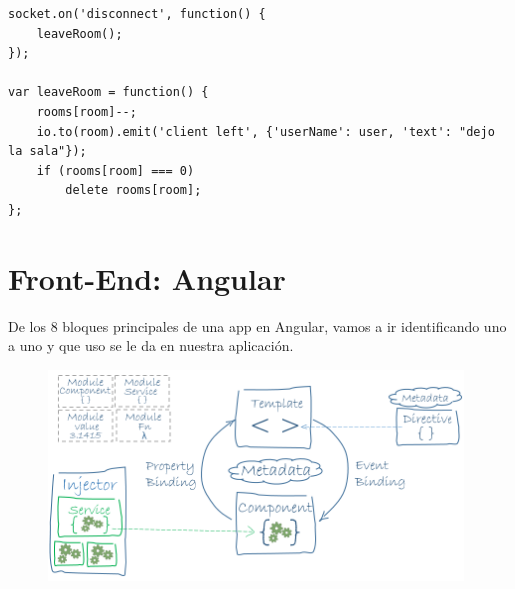 \begin{itemize}
\begin{enumerate}
\end{enumerate}

\begin{lstlisting}
socket.on('disconnect', function() {
    leaveRoom();
});

var leaveRoom = function() {
    rooms[room]--;
    io.to(room).emit('client left', {'userName': user, 'text': "dejo la sala"});
    if (rooms[room] === 0)
        delete rooms[room];
};
\end{lstlisting}


\end{itemize}

\section{Front-End: Angular}

De los 8 bloques principales de una app en Angular, vamos a ir identificando uno a uno y que uso se le da en nuestra aplicación.

\begin{figure}[H]
    \centering
    \includegraphics[width=110mm]{memoria/LaTeX/img/infraestructura/angular2Architecture.png}
\end{figure}

